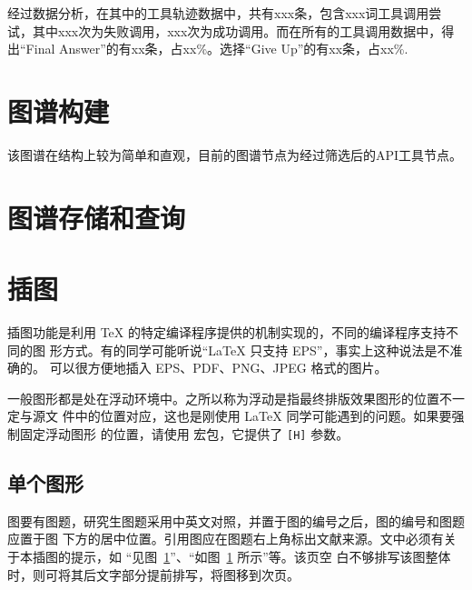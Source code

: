 经过数据分析，在其中的工具轨迹数据中，共有xxx条，包含xxx词工具调用尝试，其中xxx次为失败调用，xxx次为成功调用。而在所有的工具调用数据中，得出“Final Answer”的有xx条，占xx\%。选择“Give Up”的有xx条，占xx\%.



\section{图谱构建}

该图谱在结构上较为简单和直观，目前的图谱节点为经过筛选后的API工具节点。



\section{图谱存储和查询}

\section{插图}

插图功能是利用 \TeX{} 的特定编译程序提供的机制实现的，不同的编译程序支持不同的图
形方式。有的同学可能听说“\LaTeX{} 只支持 EPS”，事实上这种说法是不准确的。\XeTeX{}
可以很方便地插入 EPS、PDF、PNG、JPEG 格式的图片。

一般图形都是处在浮动环境中。之所以称为浮动是指最终排版效果图形的位置不一定与源文
件中的位置对应，这也是刚使用 \LaTeX{} 同学可能遇到的问题。如果要强制固定浮动图形
的位置，请使用  宏包，它提供了 \texttt{[H]} 参数。

\subsection{单个图形}

图要有图题，研究生图题采用中英文对照，并置于图的编号之后，图的编号和图题应置于图
下方的居中位置。引用图应在图题右上角标出文献来源。文中必须有关于本插图的提示，如
“见图~\ref{fig:energy-distrib}”、“如图~\ref{fig:energy-distrib} 所示”等。该页空
白不够排写该图整体时，则可将其后文字部分提前排写，将图移到次页。

\begin{figure}[!htp]
  \centering
  \label{fig:energy-distrib}
\end{figure}

